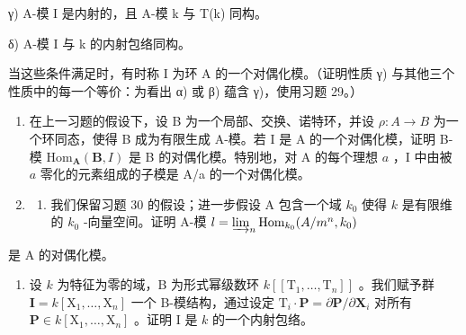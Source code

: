 γ) A-模 I 是内射的，且 A-模 k 与 T(k) 同构。

δ) A-模 I 与 k 的内射包络同构。

当这些条件满足时，有时称 I 为环 A 的一个对偶化模。（证明性质 γ) 与其他三个性质中的每一个等价：为看出 α) 或 β) 蕴含 γ)，使用习题 29。）

\begin{enumerate}
\def\labelenumi{\arabic{enumi})}
\setcounter{enumi}{30}
\item
  在上一习题的假设下，设 B 为一个局部、交换、诺特环，并设 \(\rho: A \to B\) 为一个环同态，使得 B 成为有限生成 A-模。若 I 是 A 的一个对偶化模，证明 B-模 \(\mathrm{Hom}_{\mathbf{A}}(\mathbf{B}, I)\) 是 B 的对偶化模。特别地，对 A 的每个理想 \(a\) ，I 中由被 \(a\) 零化的元素组成的子模是 A/a 的一个对偶化模。
\item
  \begin{enumerate}
  \def\labelenumii{\alph{enumii})}
  \tightlist
  \item
    我们保留习题 30 的假设；进一步假设 A 包含一个域 \(k_0\) 使得 \(k\) 是有限维的 \(k_0\) -向量空间。证明 A-模 \(l = \varinjlim_{n} \operatorname{Hom}_{k_0}(A/m^n, k_0)\)
  \end{enumerate}
\end{enumerate}

是 A 的对偶化模。

\begin{enumerate}
\def\labelenumi{\alph{enumi})}
\setcounter{enumi}{1}
\tightlist
\item
  设 \(k\) 为特征为零的域，B 为形式幂级数环 \(k[[\mathrm{T}_{1}, \ldots, \mathrm{T}_{n}]]\) 。我们赋予群 \(\mathbf{I} = k[\mathrm{X}_{1}, \ldots, \mathrm{X}_{n}]\) 一个 B-模结构，通过设定 \(\mathrm{T}_{i} \cdot \mathbf{P} = \partial \mathbf{P} / \partial \mathbf{X}_{i}\) 对所有 \(\mathbf{P} \in k[\mathrm{X}_{1}, \ldots, \mathrm{X}_{n}]\) 。证明 I 是 \(k\) 的一个内射包络。
\end{enumerate}

